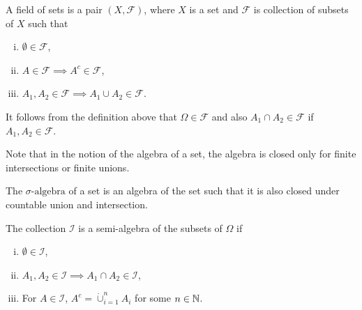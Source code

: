 \begin{definition}
	A field of sets is a pair $ (X,\mathcal{F}) $, where $ X $ is a set and $ \mathcal{F} $ is collection of subsets of $ X $ such that 
	\begin{enumerate}[(i),noitemsep]
		\item $ \emptyset \in \mathcal{F} $,
		\item $ A \in \mathcal{F} \implies A^c \in \mathcal{F} $,
		\item $ A_1, A_2 \in \mathcal{F} \implies A_1 \cup A_2 \in \mathcal{F} $.
	\end{enumerate}
	\begin{remark}
		It follows from the definition above that $ \Omega \in \mathcal{F} $ and also $ A_1 \cap A_2 \in \mathcal{F} $ if $ A_1,A_2 \in \mathcal{F} $.
	\end{remark}
\end{definition}
Note that in the notion of the algebra of a set, the algebra is closed only for finite intersections or finite unions. 

\begin{definition}
	The $ \sigma\text{-algebra} $ of a set is an algebra of the set such that it is also closed under countable union and intersection.
\end{definition}

\begin{definition}
	The collection $ \mathcal{I} $ is a semi-algebra of the subsets of $ \Omega $ if
	\begin{enumerate}[(i)]
		\item $ \emptyset \in \mathcal{I} $,
		\item $ A_1, A_2 \in \mathcal{I} \implies A_1 \cap A_2 \in \mathcal{I} $,
		\item For $ A \in \mathcal{I} $, $ A^c = \dot\cup_{i=1}^{n}A_i $ for some $ n \in \mathbb{N} $. 
	\end{enumerate}
\end{definition}


